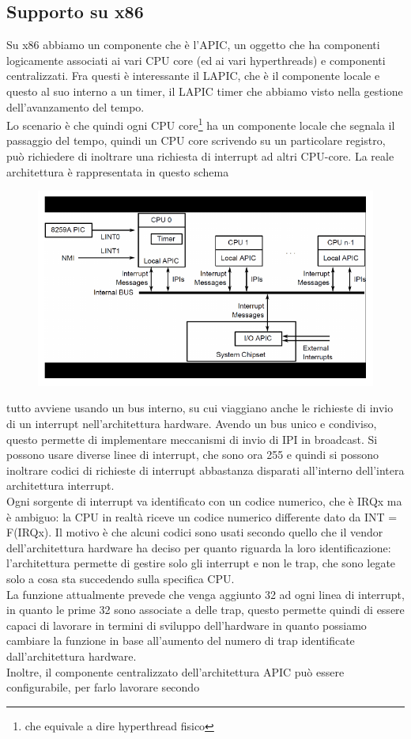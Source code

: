 \documentclass[12pt, oneside]{extbook}
\begin{document}
\subsection{Supporto su x86}
Su x86 abbiamo un componente che è l'APIC, un oggetto che ha componenti logicamente associati ai vari CPU core (ed ai vari hyperthreads) e componenti centralizzati. Fra questi è interessante il LAPIC, che è il componente locale e questo al suo interno a un timer, il LAPIC timer che abbiamo visto nella gestione dell'avanzamento del tempo.\\Lo scenario è che quindi ogni CPU core\footnote{che equivale a dire hyperthread fisico} ha un componente locale che segnala il passaggio del tempo, quindi un CPU core scrivendo su un particolare registro, può richiedere di inoltrare una richiesta di interrupt ad altri CPU-core. La reale architettura è rappresentata in questo schema
\begin{figure}[!h]
	\includegraphics[scale=0.4]{immagini/APIC_architecture.png}
\end{figure}
tutto avviene usando un bus interno, su cui viaggiano anche le richieste di invio di un interrupt nell'architettura hardware. Avendo un bus unico e condiviso, questo permette di implementare meccanismi di invio di IPI in broadcast. Si possono usare diverse linee di interrupt, che sono ora 255 e quindi si possono inoltrare codici di richieste di interrupt abbastanza disparati all'interno dell'intera architettura interrupt.\\Ogni sorgente di interrupt va identificato con un codice numerico, che è IRQx ma è ambiguo: la CPU in realtà riceve un codice numerico differente dato da INT = F(IRQx). Il motivo è che alcuni codici sono usati secondo quello che il vendor dell'architettura hardware ha deciso per quanto riguarda la loro identificazione: l'architettura permette di gestire solo gli interrupt e non le trap, che sono legate solo a cosa sta succedendo sulla specifica CPU.\\La funzione attualmente prevede che venga aggiunto 32 ad ogni linea di interrupt, in quanto le prime 32 sono associate a delle trap, questo permette quindi di essere capaci di lavorare in termini di sviluppo dell'hardware in quanto possiamo cambiare la funzione in base all'aumento del numero di trap identificate dall'architettura hardware.\\Inoltre, il componente centralizzato dell'architettura APIC può essere configurabile, per farlo lavorare secondo
\end{document}
